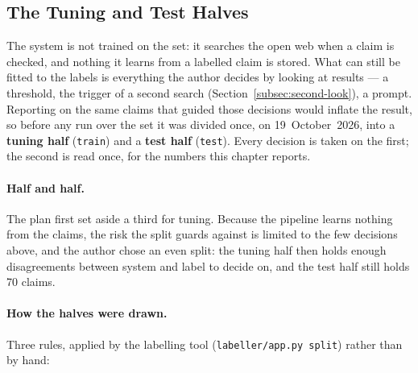 
\subsection{The Tuning and Test Halves}
\label{subsec:custom-split}

The system is not trained on the set: it searches the open web when a
claim is checked, and nothing it learns from a labelled claim is stored.
What can still be fitted to the labels is everything the author decides
by looking at results --- a threshold, the trigger of a second search
(Section~\ref{subsec:second-look}), a prompt. Reporting on the same
claims that guided those decisions would inflate the result, so before
any run over the set it was divided once, on 19~October~2026, into a
\textbf{tuning half} (\texttt{train}) and a \textbf{test half}
(\texttt{test}). Every decision is taken on the first; the second is
read once, for the numbers this chapter reports.

\paragraph{Half and half.} The plan first set aside a third for tuning.
Because the pipeline learns nothing from the claims, the risk the split
guards against is limited to the few decisions above, and the author
chose an even split: the tuning half then holds enough disagreements
between system and label to decide on, and the test half still holds
70 claims.

\paragraph{How the halves were drawn.} Three rules, applied by the
labelling tool (\texttt{labeller/app.py split}) rather than by hand:

